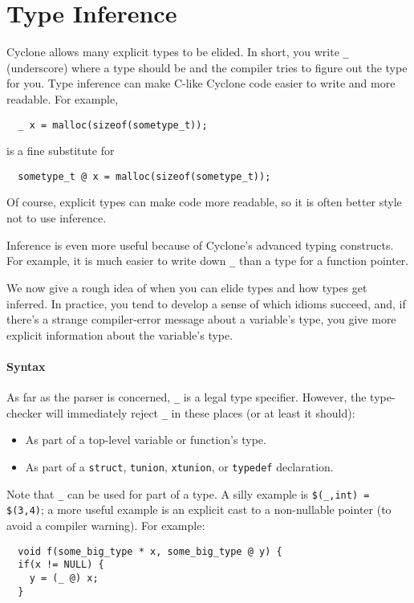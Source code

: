 \section{Type Inference}
\hypertarget{type_inference_sec}{}

Cyclone allows many explicit types to be elided.  In short, you write
\texttt{_} (underscore) where a type should be and the compiler tries to
figure out the type for you.  Type inference can make C-like Cyclone
code easier to write and more readable.  For example,
\begin{verbatim}
  _ x = malloc(sizeof(sometype_t));
\end{verbatim}
is a fine substitute for
\begin{verbatim}
  sometype_t @ x = malloc(sizeof(sometype_t));
\end{verbatim}
Of course, explicit types can make code more readable, so it is often
better style not to use inference.

Inference is even more useful because of Cyclone's advanced typing
constructs.  For example, it is much easier to write down \texttt{_}
than a type for a function pointer.  

We now give a rough idea of when you can elide types and how types get
inferred.  In practice, you tend to develop a sense of which idioms
succeed, and, if there's a strange compiler-error message about a
variable's type, you give more explicit information about the
variable's type.

\paragraph{Syntax}
As far as the parser is
concerned, \texttt{_} is a legal type specifier.  However, the type-checker
will immediately reject \texttt{_} in these places (or at least it
should):

\begin{itemize}
\item As part of a top-level variable or function's type.
\item As part of a \texttt{struct}, \texttt{tunion}, \texttt{xtunion}, or
  \texttt{typedef} declaration.
\end{itemize}

Note that \texttt{_} can be used for part of a type.  A silly example is
\texttt{\$(_,int) = \$(3,4)}; a more useful example is an explicit cast to
a non-nullable pointer (to avoid a compiler warning).  For example:
\begin{verbatim}
  void f(some_big_type * x, some_big_type @ y) {
  if(x != NULL) {
    y = (_ @) x;
  }
\end{verbatim}

